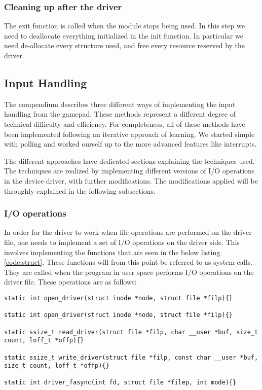 \subsubsection{Cleaning up after the driver}
The exit function is called when the module stops being used. In this step we need to deallocate everything initialized in the init function. In particular we need de-allocate every structure used, and free every resource reserved by the driver. 






\subsection{Input Handling}
The compendium describes three different ways of implementing the input handling from the gamepad. These methods represent a different degree of technical difficulty and efficiency. For completeness, all of these methods have been implemented following an iterative approach of learning. We started simple with polling and worked ourself up to the more advanced features like interrupts.

The different approaches have dedicated sections explaining the techniques used. The techniques are realized by implementing different versions of I/O operations in the device driver, with further modifications. The modifications applied will be throughly explained in the following subsections. 


\subsubsection{I/O operations}
In order for the driver to work when file operations are performed on the driver file, one needs to implement a set of I/O operations on the driver side. This involves implementing the functions that are seen in the below listing \ref{code:struct}. These functions will from this point be referred to as system calls. They are called when the program in user space performs I/O operations on the driver file. These operations are as follows: 

\begin{lstlisting}[caption=System calls, label=code:func]
static int open_driver(struct inode *node, struct file *filp){}

static int open_driver(struct inode *node, struct file *filp){}

static ssize_t read_driver(struct file *filp, char __user *buf, size_t count, loff_t *offp){}

static ssize_t write_driver(struct file *filp, const char __user *buf, size_t count, loff_t *offp){}

static int driver_fasync(int fd, struct file *filep, int mode){}
\end{lstlisting}




